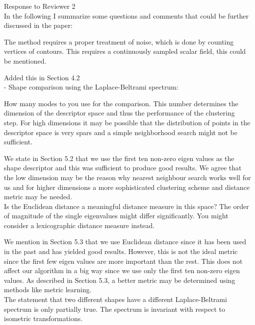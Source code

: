 \documentclass[10pt]{article}
\begin{document}
{\noindent \LARGE Response to Reviewer 2}\\

	In the following I summarize some questions and comments that could be
   further discussed in the paper:

   The method requires a proper treatment of noise, which is done by
   counting vertices of contours. This requires a continuously sampled
   scalar field, this could be mentioned.

   {\color{blue}Added this in Section 4.2}\\

   - Shape comparison using the Laplace-Beltrami spectrum:

   How many modes to you use for the comparison. This number determines
   the dimension of the descriptor space and thus the performance of the
   clustering step. For high dimensions it may be possible that the
   distribution of points in the descriptor space is very spars and a simple
   neighborhood search might not be sufficient. 

   {\color{blue}We state in Section 5.2 that we use the first ten non-zero eigen
	   values as the shape descriptor and this was sufficient to produce
	   good results. 
	   We agree that the low dimension
	   may be the reason why
	   nearest neighbour search works well for us 
	   and for higher dimensions a more sophisticated clustering
   scheme and distance metric may be needed.}\\

   Is the Euclidean distance a meaningful distance measure in this space?
   The order of magnitude of the single eigenvalues might differ
   significantly. You might consider a lexicographic distance measure
   instead.

   {\color{blue}We mention in Section 5.3 that we use Euclidean distance
	   since it has been used in the past and has yielded good results.
	   However, this is not the ideal metric since the first few eigen
	   values are more important than the rest. This does not affect our
	   algorithm in a big way since we use only the first ten non-zero
	   eigen values. As described in Section 5.3, a better metric may
   be determined using methods like metric learning.}\\

   The statement that two different shapes have a different
   Laplace-Beltrami spectrum is only partially true. The spectrum is
   invariant with respect to isometric transformations.  
\end{document}
